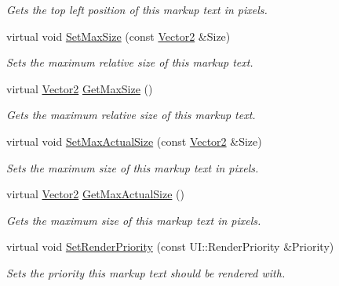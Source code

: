\begin{DoxyCompactItemize}
\begin{DoxyCompactList}\small\item\em Gets the top left position of this markup text in pixels. \item\end{DoxyCompactList}\item 
virtual void \hyperlink{classphys_1_1UI_1_1MarkupText_ad4381a00f10d02152fd6df737fba60a4}{SetMaxSize} (const \hyperlink{classphys_1_1Vector2}{Vector2} \&Size)
\begin{DoxyCompactList}\small\item\em Sets the maximum relative size of this markup text. \item\end{DoxyCompactList}\item 
virtual \hyperlink{classphys_1_1Vector2}{Vector2} \hyperlink{classphys_1_1UI_1_1MarkupText_ae68fd261f2dc9494a16e3089c7a35b8a}{GetMaxSize} ()
\begin{DoxyCompactList}\small\item\em Gets the maximum relative size of this markup text. \item\end{DoxyCompactList}\item 
virtual void \hyperlink{classphys_1_1UI_1_1MarkupText_af14f0447c4785ab8555c897c66e87b79}{SetMaxActualSize} (const \hyperlink{classphys_1_1Vector2}{Vector2} \&Size)
\begin{DoxyCompactList}\small\item\em Sets the maximum size of this markup text in pixels. \item\end{DoxyCompactList}\item 
virtual \hyperlink{classphys_1_1Vector2}{Vector2} \hyperlink{classphys_1_1UI_1_1MarkupText_a4a742f4d64038ded68c5480f4cf3e017}{GetMaxActualSize} ()
\begin{DoxyCompactList}\small\item\em Gets the maximum size of this markup text in pixels. \item\end{DoxyCompactList}\item 
virtual void \hyperlink{classphys_1_1UI_1_1MarkupText_a232c86702720af9d919e51846a79d35a}{SetRenderPriority} (const UI::RenderPriority \&Priority)
\begin{DoxyCompactList}\small\item\em Sets the priority this markup text should be rendered with. \item\end{DoxyCompactList}\item 

\end{DoxyCompactItemize}
